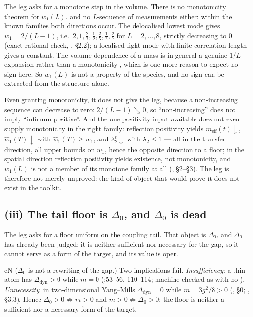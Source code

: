The leg asks for a monotone step in the volume. There is no monotonicity theorem for $w_1(L)$, and no
$L$-sequence of measurements either; within the known families both directions occur. The
delocalised lowest mode gives $w_1=2/(L-1)$, i.e.\ $2,1,\tfrac23,\tfrac12,\tfrac25,\tfrac13,\tfrac27$
for $L=2,\dots,8$, strictly decreasing to $0$ (exact rational check, , \S2.2); a
localised light mode with finite correlation length gives a constant. The volume dependence of a
mass is in general a genuine $1/L$ expansion rather than a monotonicity \cite{luscher77}, which is
one more reason to expect no sign here. So $w_1(L)$ is not a property of the species, and no sign can
be extracted from the structure alone.

Even granting monotonicity, it does not give the leg, because a non-increasing sequence can decrease
to zero: $2/(L-1)\searrow0$, so ``non-increasing'' does not imply ``infimum positive''. And the one
positivity input available does not even supply monotonicity in the right family: reflection
positivity yields $m_{\mathrm{eff}}(t)\downarrow$, $\widehat{w}_1(T)\downarrow$ with
$\widehat{w}_1(T)\ge w_1$, and $\lambda_2^t\downarrow$ with $\lambda_2\le1$ --- all in the transfer
direction, all upper bounds on $w_1$, hence the opposite direction to a floor; in the spatial
direction reflection positivity yields existence, not monotonicity, and $w_1(L)$ is not a member of
its monotone family at all (, \S2--\S3). The leg is therefore not merely unproved: the
kind of object that would prove it does not exist in the toolkit.

\subsection{(iii) The tail floor is \texorpdfstring{$\Delta_0$}{Delta\_0}, and \texorpdfstring{$\Delta_0$}{Delta\_0} is dead}

The leg asks for a floor uniform on the coupling tail. That object is $\Delta_0$, and $\Delta_0$ has
already been judged: it is neither sufficient nor necessary for the gap, so it cannot serve as a
form of the target, and its value is open.

\begin{claimbox}{cN}
 ($\Delta_0$ is not a rewriting of the gap.) Two implications fail.
\emph{Insufficiency}: a thin atom has $\Delta_{\mathrm{dyn}}>0$ while $m=0$
(:53--56, 110--114; machine-checked as  with
no ). \emph{Unnecessity}: in two-dimensional Yang--Mills $\Delta_{\mathrm{dyn}}=0$ while
$m=3g^2/8>0$ (, \S0; , \S3.3). Hence
$\Delta_0>0\not\Rightarrow m>0$ and $m>0\not\Rightarrow\Delta_0>0$: the floor is neither a
sufficient nor a necessary form of the target.
\end{claimbox}

